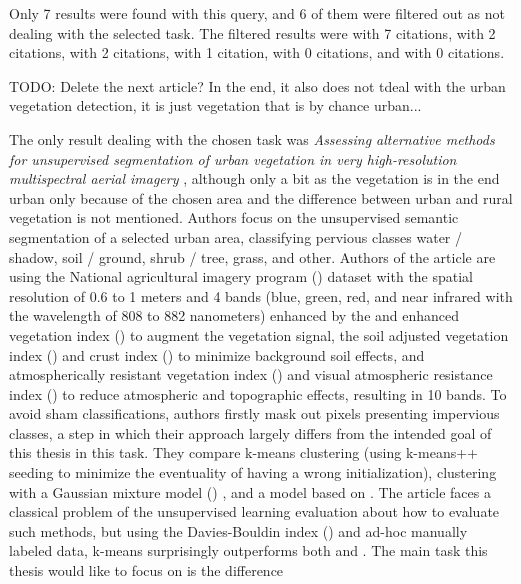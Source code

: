Only 7 results were found with this query, and 6 of them were filtered out as not dealing with the selected task. The filtered results were \cite{tree-detection-uav-cnn} with 7 citations, \cite{cascaded-cnn-trees} with 2 citations, \cite{window-zooming-fruit} with 2 citations, \cite{urban-green-quantification} with 1 citation, \cite{urban-green-obesity} with 0 citations, and \cite{urban-green-contamination} with 0 citations.

TODO: Delete the next article? In the end, it also does not tdeal with the urban vegetation detection, it is just vegetation that is by chance urban...

The only result dealing with the chosen task was \textit{Assessing alternative methods for unsupervised segmentation of urban vegetation in very high-resolution multispectral aerial imagery} \cite{urban-green-unsupervised-aerial}, although only a bit as the vegetation is in the end urban only because of the chosen area and the difference between urban and rural vegetation is not mentioned. Authors focus on the unsupervised semantic segmentation of a selected urban area, classifying pervious classes water / shadow, soil / ground, shrub / tree, grass, and other. Authors of the article are using the National agricultural imagery program () dataset with the spatial resolution of 0.6 to 1 meters and 4 bands (blue, green, red, and near infrared with the wavelength of 808 to 882 nanometers) enhanced by the  and enhanced vegetation index () to augment the vegetation signal, the soil adjusted vegetation index () and crust index () to minimize background soil effects, and atmospherically resistant vegetation index () and visual atmospheric resistance index () to reduce atmospheric and topographic effects, resulting in 10 bands. To avoid sham classifications, authors firstly mask out pixels presenting impervious classes, a step in which their approach largely differs from the intended goal of this thesis in this task. They compare k-means clustering \cite{k-means} (using k-means++ seeding \cite{k-means-plusplus} to minimize the eventuality of having a wrong initialization), clustering with a Gaussian mixture model () \cite{gmm}, and a  model based on \cite{cnn-hs-unsupervised-fuzzy}. The article faces a classical problem of the unsupervised learning evaluation about how to evaluate such methods, but using the Davies-Bouldin index () \cite{dbi} and ad-hoc manually labeled data, k-means surprisingly outperforms both  and . The main task this thesis would like to focus on is the difference

